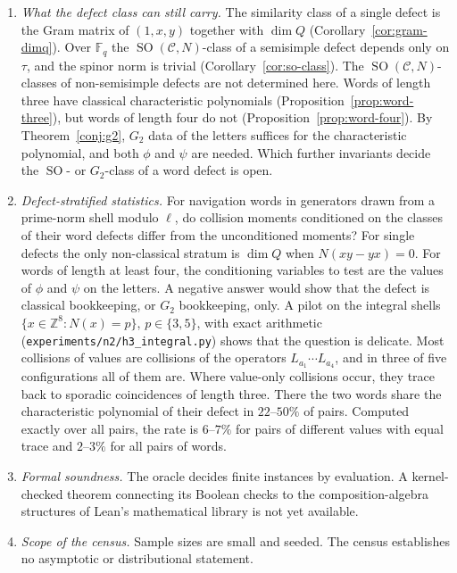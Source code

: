\documentclass[11pt]{amsart}
\theoremstyle{definition}
\theoremstyle{remark}
\newcommand{\F}{\mathbb{F}}
\newcommand{\C}{\mathcal{C}}
\DeclareMathOperator{\SO}{SO}
\begin{document}
\begin{enumerate}[label=(\arabic*)]
\item \emph{What the defect class can still carry.} The similarity class
  of a single defect is the Gram matrix of $(1,x,y)$ together with $\dim Q$
  (Corollary~\ref{cor:gram-dimq}). Over $\F_q$ the $\SO(\C,N)$-class of a
  semisimple defect depends only on $\tau$, and the spinor norm is trivial
  (Corollary~\ref{cor:so-class}). The $\SO(\C,N)$-classes of non-semisimple
  defects are not determined here. Words of length three have classical
  characteristic polynomials (Proposition~\ref{prop:word-three}), but words
  of length four do not (Proposition~\ref{prop:word-four}).
  By Theorem~\ref{conj:g2}, $G_2$ data of the letters suffices for the
  characteristic polynomial, and both $\phi$ and $\psi$ are needed. Which
  further invariants decide the $\SO$- or $G_2$-class of a word defect is open.
\item \emph{Defect-stratified statistics.} For navigation words in generators
  drawn from a prime-norm shell modulo $\ell$, do collision moments
  conditioned on the classes of their word defects differ from the
  unconditioned moments? For single defects the only non-classical stratum
  is $\dim Q$ when $N(xy-yx)=0$. For words of length at least four, the
  conditioning variables to test are the values of $\phi$ and $\psi$ on the
  letters. A negative answer would show that the defect is classical
  bookkeeping, or $G_2$ bookkeeping, only. A pilot on the integral shells
  $\{x\in\mathbb{Z}^8:N(x)=p\}$, $p\in\{3,5\}$, with exact arithmetic
  (\texttt{experiments/n2/h3\_integral.py}) shows that the question is
  delicate. Most collisions of values are collisions of the operators
  $L_{a_1}\cdots L_{a_4}$, and in three of five configurations all of them
  are. Where value-only collisions occur, they trace back to sporadic
  coincidences of length three. There the two words share the characteristic
  polynomial of their defect in $22$--$50\%$ of pairs. Computed exactly over
  all pairs, the rate is $6$--$7\%$ for pairs of different values with equal
  trace and $2$--$3\%$ for all pairs of words.
\item \emph{Formal soundness.} The oracle decides finite instances by
  evaluation. A kernel-checked theorem connecting its Boolean checks to the
  composition-algebra structures of Lean's mathematical library is not yet
  available.
\item \emph{Scope of the census.} Sample sizes are small and seeded. The
  census establishes no asymptotic or distributional statement.
\end{enumerate}
\end{document}
